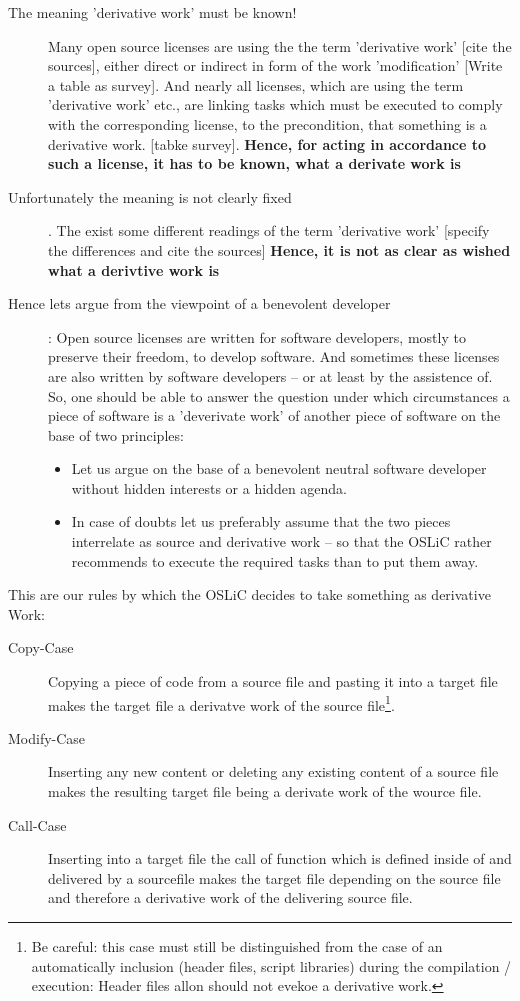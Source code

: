 \begin{description}
  \item[The meaning 'derivative work' must be known!] Many open source licenses
  are using the the term 'derivative work'  [cite the sources], either direct or
  indirect in form of the work 'modification' [Write a table as survey]. And
  nearly all licenses, which are using the term 'derivative work' etc., are
  linking tasks which must be executed to comply with the corresponding license,
  to the precondition, that something is a derivative work.
  [tabke survey]. \textbf{Hence, for acting in accordance to such a license, it
  has to be known, what a derivate work is}
  \item[Unfortunately the meaning is not clearly fixed]. The exist some
  different readings of the term 'derivative work' [specify the differences and
  cite the sources] \textbf{Hence, it is not as clear as wished what a derivtive
  work is}
  \item[Hence lets argue from the viewpoint of a benevolent developer]: Open
  source licenses are written for software developers, mostly to preserve their
  freedom, to develop software. And sometimes these licenses are also written by
  software developers -- or at least by the assistence of. So, one should be
  able to answer the question under which circumstances a piece of software is a
  'deverivate work' of another piece of software on the base of two principles:
  \begin{itemize}
  \item Let us argue on the base of a benevolent neutral software developer
  without hidden interests or a hidden agenda.
  \item In case of doubts let us preferably assume that the two pieces
  interrelate as source and derivative work -- so that the OSLiC rather recommends
  to execute the required tasks than to put them away.
\end{itemize}
\end{description}

This are our rules by which the OSLiC decides to take something as derivative Work:
\label{sec:BenevolentDerivativeWorkUnderstanding}

\begin{description}
  \item[Copy-Case] Copying a piece of code from a source file and pasting it
  into a target file makes the target file a derivatve work of the source
  file\footnote{ Be careful: this case must still be distinguished from the case
  of an automatically inclusion (header files, script libraries) during the
  compilation / execution: Header files allon should not evekoe a derivative work.}.
  \item[Modify-Case] Inserting any new content or deleting any existing content
  of a source file makes the resulting target file being a derivate work of the
  wource file.
  \item[Call-Case] Inserting into a target file the call of function which is
  defined inside of and delivered by a sourcefile makes the target file depending
  on the source file and therefore a derivative work of the delivering source file.
\end{description}

